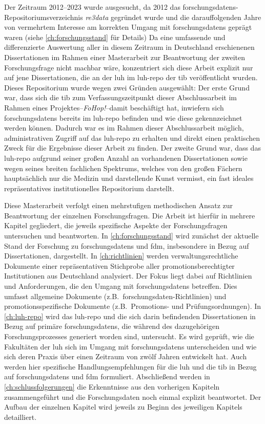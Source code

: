 Der Zeitraum 2012--2023 wurde ausgesucht, da 2012 das \glspl{forschungsdaten}-Repositoriumsverzeich\-nis \textit{re3data} gegründet wurde \autocite{Pampel2013} und die darauffolgenden Jahre von vermehrtem Interesse am korrekten Umgang mit \glspl{forschungsdaten} geprägt waren (siehe \cref{ch:forschungsstand} für Details)
Da eine umfassende und differenzierte Auswertung aller in diesem Zeitraum in Deutschland erschienenen Dissertationen im Rahmen einer Masterarbeit zur Beantwortung der zweiten Forschungsfrage nicht machbar wäre, konzentriert sich diese Arbeit explizit nur auf jene Dissertationen, die an der \gls{luh} im \gls{luh-repo} der \gls{tib} veröffentlicht wurden.
Dieses Repositorium wurde wegen zwei Gründen ausgewählt:
Der erste Grund war, dass sich die \gls{tib} zum Verfassungszeitpunkt dieser Abschlussarbeit im Rahmen eines Projektes--\textit{FoHop!}--damit beschäftigt hat, inwiefern sich \glspl{forschungsdaten} bereits im \gls{luh-repo} befinden und wie diese gekennzeichnet werden können.
Dadurch war es im Rahmen dieser Abschlussarbeit möglich, administrativen Zugriff auf das \gls{luh-repo} zu erhalten und direkt einen praktischen Zweck für die Ergebnisse dieser Arbeit zu finden.
Der zweite Grund war, dass das \gls{luh-repo} aufgrund seiner großen Anzahl an vorhandenen Dissertationen sowie wegen seines breiten fachlichen Spektrums, welches von den großen Fächern hauptsächlich nur die Medizin und darstellende Kunst vermisst, ein fast ideales repräsentatives institutionelles Repositorium darstellt.

Diese Masterarbeit verfolgt einen mehrstufigen methodischen Ansatz zur Beantwortung der einzelnen Forschungsfragen.
Die Arbeit ist hierfür in mehrere Kapitel gegliedert, die jeweils spezifische Aspekte der Forschungsfragen untersuchen und beantworten.
%
In \cref{ch:forschungsstand} wird zunächst der aktuelle Stand der Forschung zu \glspl{forschungsdaten} und \gls{fdm}, insbesondere in Bezug auf Dissertationen, dargestellt.
%
In \cref{ch:richtlinien} werden verwaltungsrechtliche Dokumente einer repräsentativen Stichprobe aller promotionsberechtigter Institutionen aus Deutschland analysiert.
Der Fokus liegt dabei auf Richtlinien und Anforderungen, die den Umgang mit \glspl{forschungsdaten} betreffen.
Dies umfasst allgemeine Dokumente (z.B.~\gls{forschungsdaten}-Richtlinien) und promotionsspezifische Dokumente (z.B.~Promotions- und Prüfungsordnungen).
%
In \cref{ch:luh-repo} wird das \gls{luh-repo} und die sich darin befindenden Dissertationen in Bezug auf primäre \glspl{forschungsdaten}, die während des dazugehörigen Forschungsprozesses generiert worden sind, untersucht.
Es wird geprüft, wie die Fakultäten der \gls{luh} sich im Umgang mit \glspl{forschungsdaten} unterscheiden und wie sich deren Praxis über einen Zeitraum von zwölf Jahren entwickelt hat.
Auch werden hier spezifische Handlungsempfehlungen für die \gls{luh} und die \gls{tib} in Bezug auf \glspl{forschungsdaten} und \gls{fdm} formuliert.
%
Abschließend werden in \cref{ch:schlussfolgerungen} die Erkenntnisse aus den vorherigen Kapiteln zusammengeführt und die Forschungsdaten noch einmal explizit beantwortet.
%
Der Aufbau der einzelnen Kapitel wird jeweils zu Beginn des jeweiligen Kapitels detailliert.